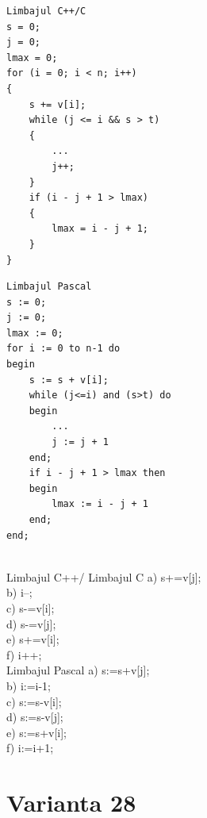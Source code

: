 \begin{verbatim}
Limbajul C++/C
s = 0;
j = 0;
lmax = 0;
for (i = 0; i < n; i++)
{
    s += v[i];
    while (j <= i && s > t)
    {
        ...
        j++;
    }
    if (i - j + 1 > lmax)
    {
        lmax = i - j + 1;
    }
}
\end{verbatim}
\begin{verbatim}
Limbajul Pascal
s := 0;
j := 0;
lmax := 0;
for i := 0 to n-1 do
begin
    s := s + v[i];
    while (j<=i) and (s>t) do
    begin
        ...
        j := j + 1
    end;
    if i - j + 1 > lmax then
    begin
        lmax := i - j + 1
    end;
end;
\end{verbatim}
\\
Limbajul C++/ Limbajul C
a) s+=v[j];
\\
b) i--;
\\
c) s-=v[i];
\\
d) s-=v[j];
\\
e) s+=v[i];
\\
f) i++;
\\
Limbajul Pascal
a) s:=s+v[j];
\\
b) i:=i-1;
\\
c) s:=s-v[i];
\\
d) s:=s-v[j];
\\
e) s:=s+v[i];
\\
f) i:=i+1;
\\

\section*{Varianta 28}

